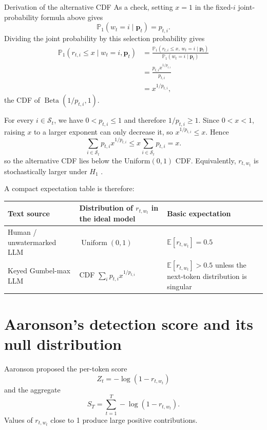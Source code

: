 \documentclass[11pt]{article}
\DeclareRobustCommand{\iperpaper}[2]{%
  \begingroup
  \hypersetup{pdfborder=0 0 0}%
  \href{iperpaper:#1}{{\color{iperpaperlink}#2}}%
  \endgroup
}
\def\iperpaper#1#2{#2}%
\newcommand{\U}{\operatorname{Uniform}}
\newcommand{\Beta}{\operatorname{Beta}}
\newcommand{\E}{\mathbb{E}}
\newcommand{\Pp}{\mathbb{P}}
\begin{document}
\begin{leveltwo}{Derivation of the alternative CDF}
As a check, setting $x=1$ in the fixed-$i$ joint-probability formula above gives
\[
  \Pp_1(w_t=i\mid\mathbf p_t)=p_{t,i}.
\]
Dividing the joint probability by this selection probability gives
\[
\begin{aligned}
\Pp_1(r_{t,i}\le x\mid w_t=i,\mathbf p_t)
&=\frac{\Pp_1(r_{t,i}\le x,\,w_t=i\mid\mathbf p_t)}
        {\Pp_1(w_t=i\mid\mathbf p_t)}\\
&=\frac{p_{t,i}x^{1/p_{t,i}}}{p_{t,i}}\\
&=x^{1/p_{t,i}},
\end{aligned}
\]
the \iperpaper{cdf_name}{CDF} of $\iperpaper{beta_conditional_cdf}{\Beta(1/p_{t,i},1)}$.
\end{leveltwo}

For every $i\in\mathcal S_t$, we have $0<p_{t,i}\le1$ and therefore
$1/p_{t,i}\ge1$. Since $0<x<1$, raising $x$ to a larger exponent can only
decrease it, so $x^{1/p_{t,i}}\le x$. Hence
\[
\sum_{i\in\mathcal S_t} p_{t,i}x^{1/p_{t,i}}
\le x\sum_{i\in\mathcal S_t} p_{t,i}=x.
\]
so the alternative \iperpaper{cdf_name}{CDF} lies below the \iperpaper{uniform_name}{Uniform}$(0,1)$ \iperpaper{cdf_name}{CDF}. Equivalently, $r_{t,w_t}$ is stochastically larger under $H_1$ \cite{li2025}.

A compact expectation table is therefore:
\begin{center}
\begin{tabularx}{\textwidth}{>{\raggedright\arraybackslash}p{} X X}
\toprule
Text source & Distribution of $r_{t,w_t}$ in the ideal model & Basic expectation \\
\midrule
Human / unwatermarked LLM & $\iperpaper{uniform_symbol}{\U}(0,1)$ & $\E[r_{t,w_t}]=0.5$ \\
Keyed Gumbel-max LLM & \iperpaper{cdf_name}{CDF} $\sum_i p_{t,i}x^{1/p_{t,i}}$ & $\E[r_{t,w_t}]>0.5$ unless the next-token distribution is singular \\
\bottomrule
\end{tabularx}
\end{center}


\section{Aaronson's detection score and its null distribution}

Aaronson proposed the per-token score
\begin{equation}
  \iperpaper{aaronson_token_score}{Z_t=-\log(1-r_{t,w_t})}
  \label{eq:Zscore}
\end{equation}
and the aggregate
\begin{equation}
  \iperpaper{aggregate_score}{S_T=\sum_{t=1}^{T}-\log(1-r_{t,w_t})}.
  \label{eq:St}
\end{equation}
Values of $r_{t,w_t}$ close to 1 produce large positive contributions.
\end{document}

